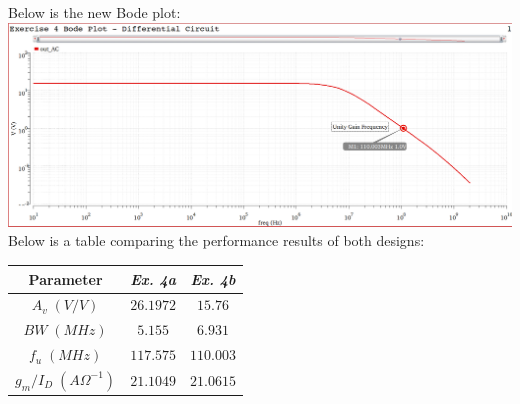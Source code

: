 \documentclass[12pt, fleqn]{article}
\begin{document}
\newpage
Below is the new Bode plot:\\[0.25cm]
\includegraphics[scale=0.275, center]{bode6.PNG}\\[0.25cm]
Below is a table comparing the performance results of both designs:
    \begin{table}[H]
    \centering
    \setlength{\tabcolsep}{20pt}
    \renewcommand{\arraystretch}{1.5}
        \begin{tabular}{|c|c|c|}
            \hline
            \textbf{Parameter} & \textit{Ex. 4a} & \textit{Ex. 4b}\\
            \hline
            $A_v\;(V/V)$ & $26.1972$ & $15.76$\\
            \hline
            $BW\;(MHz)$ & $5.155$ & $6.931$\\
            \hline
            $f_u\;(MHz)$ & $117.575$ & $110.003$\\
            \hline
            $g_m / I_D\;({A\Omega}^{-1})$ & $21.1049$ & $21.0615$\\
            \hline
        \end{tabular}
    \end{table}
\newpage
\end{document}
